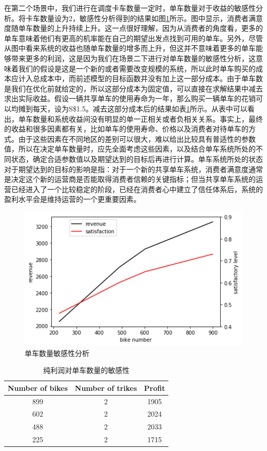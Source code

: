 \documentclass[]{tongjithesis}
\numberwithin{equation}{chapter}
\begin{document}
在第二个场景中，我们进行在调度卡车数量一定时，单车数量对于收益的敏感性分析。将卡车数量设为2，敏感性分析得到的结果如图\ref{sens_bike}所示。图中显示，消费者满意度随单车数量的上升持续上升。这一点很好理解，因为从消费者的角度看，更多的单车意味着他们有更高的机率能在自己的期望出发点找到可用的单车。另外，尽管从图中看来系统的收益也随单车数量的增多而上升，但这并不意味着更多的单车能够带来更多的利润，这是因为我们在场景二下进行对单车数量的敏感性分析，这意味着我们的假设是这是一个新的或者需要改变规模的系统，所以此时单车购买的成本应计入总成本中，而前述模型的目标函数并没有加上这一部分成本。由于单车数是我们在优化前就给定的，所以这部分成本为固定值，可以直接在求解结果中减去求出实际收益。假设一辆共享单车的使用寿命为一年，那么购买一辆单车的花销可以均摊到每天，设为S\$1.5。减去这部分成本后的结果如表\ref{sens_profit}所示。从表中可以看出，单车数量和系统收益间没有明显的单一正相关或者负相关关系。事实上，最终的收益和很多因素都有关，比如单车的使用寿命、价格以及消费者对待单车的方式。由于这些因素在不同地区的差别可以很大，难以给出比较具有普适性的参数值，所以在决定单车数量时，应先全面考虑这些因素，以及结合单车系统所处的不同状态，确定合适参数值以及期望达到的目标后再进行计算。单车系统所处的状态对于期望达到的目标的影响是指：对于一个新的共享单车系统，消费者满意度通常是决定这个新的运营商是否能取得消费者信赖的关键指标；但当共享单车系统的运营已经进入了一个比较稳定的阶段，已经在消费者心中建立了信任体系后，系统的盈利水平会是维持运营的一个更重要因素。
\begin{figure}[H]
    \centering
    \includegraphics[width=0.5 \textwidth]{figures_main/sensitivity_bike.png}
    \caption{单车数量敏感性分析}
    \label{sens_bike}
\end{figure}

\begin{table}[H]
    \centering
    \caption{纯利润对单车数量的敏感性}
    \label{sens_profit}
    \begin{tabular}{c|c|c}
    \hline
    \textbf{Number of bikes} &\textbf{Number of trikes} &\textbf{Profit}\\
    \hline
    899 &2 &1905\\
    602 &2 &2024\\
    488 &2 &2033\\
    225 &2 &1715\\
    \hline
    \end{tabular}
\end{table}
\end{document}
